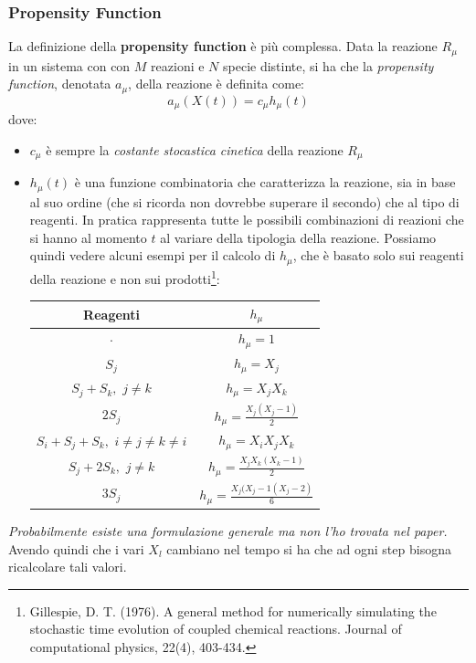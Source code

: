 \documentclass[a4paper,12pt, oneside]{book}
\begin{document}
\subsubsection{Propensity Function}
La definizione della \textbf{propensity function} è più complessa. Data la
reazione $R_\mu$ in un sistema con con $M$ reazioni e $N$
specie distinte, si ha che la \textit{propensity function}, denotata $a_\mu$,
della reazione è definita come:
\[a_\mu(X(t))=c_\mu h_\mu(t)\]
dove:
\begin{itemize}
  \item $c_\mu$ è sempre la \textit{costante stocastica cinetica} della reazione
  $R_\mu$
  \item $h_\mu(t)$ è una funzione combinatoria che caratterizza la reazione, sia
  in base al suo ordine (che si ricorda non dovrebbe superare il secondo) che al
  tipo di reagenti. In pratica rappresenta tutte le  
  possibili combinazioni di reazioni che si hanno al momento $t$ al variare
  della tipologia della reazione. Possiamo quindi vedere alcuni esempi per il
  calcolo di $h_\mu$, che è basato solo sui reagenti della reazione e non sui
  prodotti\footnote{Gillespie, D. T. (1976). A general method for numerically
    simulating the stochastic time evolution of coupled chemical
    reactions. Journal of computational physics, 22(4), 403-434.}:  
  \begin{table}[H]
    \centering
    \begin{tabular}{c|c}
      Reagenti & $h_\mu$\\
      \hline
      \hline
      $\cdot$ & $h_\mu=1$\\
      $S_j$ & $h_\mu=X_j$\\
      $S_j+S_k, \,\,j\neq k$ & $h_\mu=X_jX_k$\\
      $2S_j$ & $h_\mu=\frac{X_j(X_j-1)}{2}$\\
      $S_i+S_j+S_k,\,\, i\neq j\neq k\neq i$ & $h_\mu=X_iX_jX_k$\\
      $S_j+2S_k,\,\, j\neq k$ & $h_\mu=\frac{X_jX_k(X_k-1)}{2}$\\
      $3S_j$ & $h_\mu=\frac{X_j(X_j-1(X_j-2)}{6}$\\
    \end{tabular}
  \end{table}
\end{itemize}
\textit{Probabilmente esiste una formulazione generale ma non l'ho trovata nel
  paper.}\\ 
Avendo quindi che i vari $X_l$ cambiano nel tempo si ha che ad ogni step bisogna
ricalcolare tali valori.\\
\end{document}
